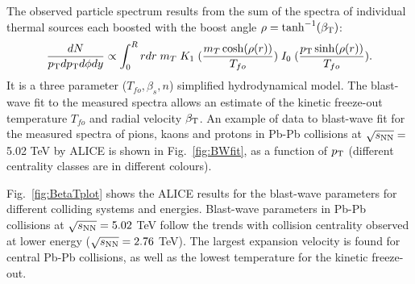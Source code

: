 The observed particle spectrum results from the sum 
of the spectra of individual thermal sources each boosted with the 
boost angle $\rho = \tanh^{-1}(\beta_{\rm T})$:
\begin{equation}
\label{eq:BlastWave}
\frac{dN}{p_{\rm T} dp_{\rm T} d\phi dy}\propto \int_{0}^{R} r dr\;  m_{T}\;  K_{1} \; (\frac{m_{T} \cosh(\rho(r))}{T_{fo}})\;  I_{0}\; (\frac{p_{\rm T} \sinh(\rho(r))}{T_{fo}}).
\end{equation}
It is a three parameter ($T_{fo}, \beta_s, n$) simplified hydrodynamical model.
The blast-wave fit to the measured spectra allows
  an estimate of the kinetic freeze-out temperature $T_{fo}$ and 
  radial velocity $\beta_{\rm T}$. An example of data to blast-wave fit for the 
  measured spectra of pions, kaons and protons in Pb-Pb collisions at $\sqrt{s_{\rm NN}} = $ 5.02 TeV 
   by ALICE is shown in Fig.~\ref{fig:BWfit}, as a function of $p_{\rm T}$ (different centrality classes 
   are in different colours).
  
Fig.~\ref{fig:BetaTplot} shows the ALICE results 
for the blast-wave parameters for different colliding systems and energies. Blast-wave parameters
  in Pb-Pb collisions at $\sqrt{s_{\rm NN}} = 5.02$ TeV follow the trends with collision centrality observed at
   lower energy ($\sqrt{s_{\rm NN}} = 2.76$ TeV). The largest expansion velocity 
   is found for central Pb-Pb collisions, as well as the lowest temperature
    for the kinetic freeze-out.\\

